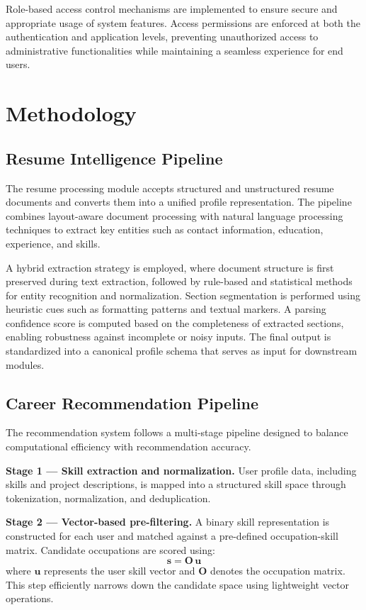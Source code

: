 \documentclass[conference]{IEEEtran}
\begin{document}
Role-based access control mechanisms are implemented to ensure secure and appropriate usage of system features. Access permissions are enforced at both the authentication and application levels, preventing unauthorized access to administrative functionalities while maintaining a seamless experience for end users.

\section{Methodology}

\subsection{Resume Intelligence Pipeline}
The resume processing module accepts structured and unstructured resume documents and converts them into a unified profile representation. The pipeline combines layout-aware document processing with natural language processing techniques to extract key entities such as contact information, education, experience, and skills. 

A hybrid extraction strategy is employed, where document structure is first preserved during text extraction, followed by rule-based and statistical methods for entity recognition and normalization. Section segmentation is performed using heuristic cues such as formatting patterns and textual markers. A parsing confidence score is computed based on the completeness of extracted sections, enabling robustness against incomplete or noisy inputs. The final output is standardized into a canonical profile schema that serves as input for downstream modules.

\subsection{Career Recommendation Pipeline}
The recommendation system follows a multi-stage pipeline designed to balance computational efficiency with recommendation accuracy.

\textbf{Stage 1 --- Skill extraction and normalization.} User profile data, including skills and project descriptions, is mapped into a structured skill space through tokenization, normalization, and deduplication.

\textbf{Stage 2 --- Vector-based pre-filtering.} A binary skill representation is constructed for each user and matched against a pre-defined occupation-skill matrix. Candidate occupations are scored using:
\begin{equation}
\mathbf{s} = \mathbf{O}\,\mathbf{u}
\end{equation}
where $\mathbf{u}$ represents the user skill vector and $\mathbf{O}$ denotes the occupation matrix. This step efficiently narrows down the candidate space using lightweight vector operations.
\end{document}
